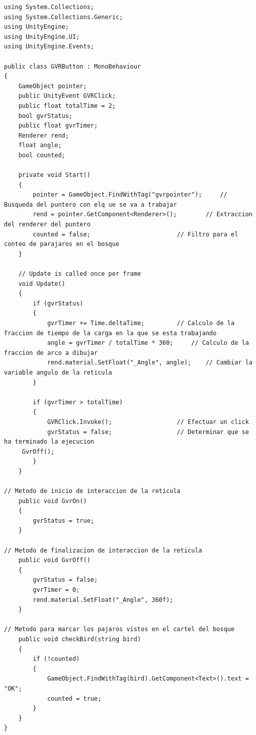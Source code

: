 \lstset{language=[sharp]C, breaklines=true, basicstyle=\footnotesize}
\begin{lstlisting}[frame=single, caption={GVRButton.cs}]
using System.Collections;
using System.Collections.Generic;
using UnityEngine;
using UnityEngine.UI;
using UnityEngine.Events;

public class GVRButton : MonoBehaviour
{
    GameObject pointer;
    public UnityEvent GVRClick;
    public float totalTime = 2;
    bool gvrStatus;
    public float gvrTimer;
    Renderer rend;
    float angle;
    bool counted;

    private void Start()
    {
        pointer = GameObject.FindWithTag("gvrpointer"); 	// Busqueda del puntero con elq ue se va a trabajar
        rend = pointer.GetComponent<Renderer>();		// Extraccion del renderer del puntero
        counted = false;						// Filtro para el conteo de parajaros en el bosque
    }

    // Update is called once per frame
    void Update()
    {
        if (gvrStatus)
        {
            gvrTimer += Time.deltaTime;			// Calculo de la fraccion de tiempo de la carga en la que se esta trabajando
            angle = gvrTimer / totalTime * 360;		// Calculo de la fraccion de arco a dibujar
            rend.material.SetFloat("_Angle", angle);	// Cambiar la variable angulo de la reticula
        }

        if (gvrTimer > totalTime)
        {
            GVRClick.Invoke();					// Efectuar un click
            gvrStatus = false;					// Determinar que se ha terminado la ejecucion
	 GvrOff();
        }
    }

// Metodo de inicio de interaccion de la reticula 
    public void GvrOn()
    {
        gvrStatus = true;
    }

// Metodo de finalizacion de interaccion de la reticula
    public void GvrOff()
    {
        gvrStatus = false;
        gvrTimer = 0;
        rend.material.SetFloat("_Angle", 360f);
    }

// Metodo para marcar los pajaros vistos en el cartel del bosque
    public void checkBird(string bird)
    {
        if (!counted)
        {
            GameObject.FindWithTag(bird).GetComponent<Text>().text = "OK";
            counted = true;
        }
    }
}

\end{lstlisting}


